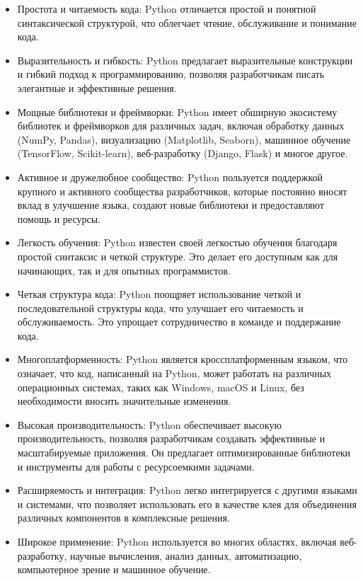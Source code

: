 \begin{itemize}
\item Простота и читаемость кода: Python отличается простой и понятной синтаксической структурой, что облегчает чтение, обслуживание и понимание кода.
\item Выразительность и гибкость: Python предлагает выразительные конструкции и гибкий подход к программированию, позволяя разработчикам писать элегантные и эффективные решения.
\item Мощные библиотеки и фреймворки: Python имеет обширную экосистему библиотек и фреймворков для различных задач, включая обработку данных (NumPy, Pandas), визуализацию (Matplotlib, Seaborn), машинное обучение (TensorFlow, Scikit-learn), веб-разработку (Django, Flask) и многое другое.
\item Активное и дружелюбное сообщество: Python пользуется поддержкой крупного и активного сообщества разработчиков, которые постоянно вносят вклад в улучшение языка, создают новые библиотеки и предоставляют помощь и ресурсы.
\item Легкость обучения: Python известен своей легкостью обучения благодаря простой синтаксис и четкой структуре. Это делает его доступным как для начинающих, так и для опытных программистов.
\item Четкая структура кода: Python поощряет использование четкой и последовательной структуры кода, что улучшает его читаемость и обслуживаемость. Это упрощает сотрудничество в команде и поддержание кода.
\item Многоплатформенность: Python является кроссплатформенным языком, что означает, что код, написанный на Python, может работать на различных операционных системах, таких как Windows, macOS и Linux, без необходимости вносить значительные изменения.
\item Высокая производительность: Python обеспечивает высокую производительность, позволяя разработчикам создавать эффективные и масштабируемые приложения. Он предлагает оптимизированные библиотеки и инструменты для работы с ресурсоемкими задачами.
\item Расширяемость и интеграция: Python легко интегрируется с другими языками и системами, что позволяет использовать его в качестве клея для объединения различных компонентов в комплексные решения.
\item Широкое применение: Python используется во многих областях, включая веб-разработку, научные вычисления, анализ данных, автоматизацию, компьютерное зрение и машинное обучение.
\end{itemize}

